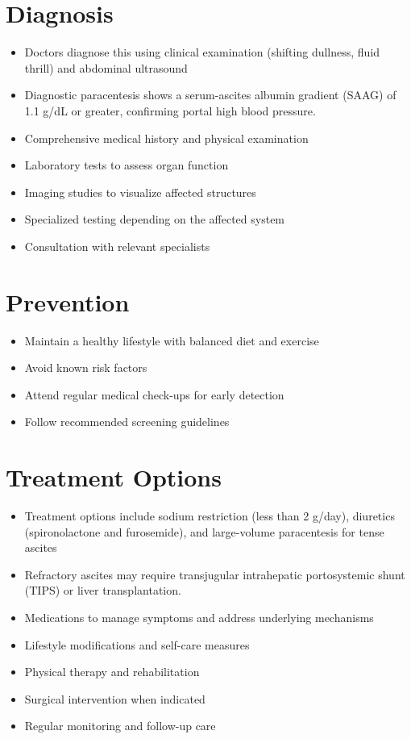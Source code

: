 \section{Diagnosis}
\begin{itemize}[noitemsep]
  \item Doctors diagnose this using clinical examination (shifting dullness, fluid thrill) and abdominal ultrasound
  \item Diagnostic paracentesis shows a serum-ascites albumin gradient (SAAG) of 1.1 g/dL or greater, confirming portal high blood pressure.
  \item Comprehensive medical history and physical examination
  \item Laboratory tests to assess organ function
  \item Imaging studies to visualize affected structures
  \item Specialized testing depending on the affected system
  \item Consultation with relevant specialists
\end{itemize}
\section{Prevention}
\begin{itemize}[noitemsep]
  \item Maintain a healthy lifestyle with balanced diet and exercise
  \item Avoid known risk factors
  \item Attend regular medical check-ups for early detection
  \item Follow recommended screening guidelines
\end{itemize}
\section{Treatment Options}
\begin{itemize}[noitemsep]
  \item Treatment options include sodium restriction (less than 2 g/day), diuretics (spironolactone and furosemide), and large-volume paracentesis for tense ascites
  \item Refractory ascites may require transjugular intrahepatic portosystemic shunt (TIPS) or liver transplantation.
  \item Medications to manage symptoms and address underlying mechanisms
  \item Lifestyle modifications and self-care measures
  \item Physical therapy and rehabilitation
  \item Surgical intervention when indicated
  \item Regular monitoring and follow-up care
\end{itemize}
